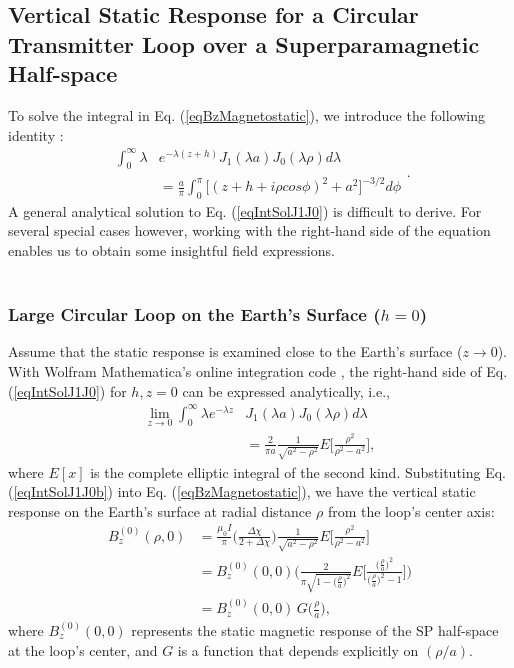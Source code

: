 \documentclass[onecolumn]{IEEEtran} %
\begin{document}
\subsection{Vertical Static Response for a Circular Transmitter Loop over a Superparamagnetic Half-space} \label{secVertical} To solve the integral in Eq. (\ref{eqBzMagnetostatic}), we introduce the following identity \citep{Erdelyi1954}:
\begin{equation}
\begin{split}
\int^{\infty}_0 \lambda &e^{-\lambda (z+h)} J_1(\lambda a) J_0 (\lambda \rho) d \lambda \\
&= \frac{a}{\pi} \int_0^\pi \big [ (z +h + i\rho cos\phi )^2 + a^2 \big ]^{-3/2} d\phi
\end{split}.
\label{eqIntSolJ1J0}
\end{equation}
A general analytical solution to Eq. (\ref{eqIntSolJ1J0}) is difficult to derive. For several special cases however, working with the right-hand side of the equation enables us to obtain some insightful field expressions.
\\\\
\subsubsection{Large Circular Loop on the Earth's Surface ($h=0$)}
Assume that the static response is examined close to the Earth's surface ($z \rightarrow 0$). With Wolfram Mathematica's online integration code \citep{Wolfram2016}, the right-hand side of Eq. (\ref{eqIntSolJ1J0}) for $h,z = 0$ can be expressed analytically, i.e.,
\begin{align}
\lim_{z \rightarrow 0} \int^{\infty}_0 \lambda e^{-\lambda z} &J_1(\lambda a) J_0 (\lambda \rho) d \lambda \nonumber \\
\label{eqIntSolJ1J0b} &= \frac{2 }{\pi a} \frac{1}{\sqrt{a^2-\rho^2}} E \Bigg [ \frac{\rho^2}{\rho^2 - a^2} \Bigg ],
\end{align}
where $E[x]$ is the complete elliptic integral of the second kind. Substituting Eq. (\ref{eqIntSolJ1J0b}) into Eq. (\ref{eqBzMagnetostatic}), we have the vertical static response on the Earth's surface at radial distance $\rho$ from the loop's center axis:
\begin{equation}
\begin{split}
B^{(0)}_z(\rho,0) &= \frac{\mu_0 I}{\pi} \Bigg ( \frac{\Delta \chi}{2+\Delta \chi} \Bigg ) \frac{1}{\sqrt{a^2 -\rho^2}} E \Bigg [ \frac{ \rho^2}{\rho^2 - a^2} \Bigg ] \\
&= B^{(0)}_z(0,0) \Bigg ( \frac{2 }{\pi \sqrt{1 -\big ( \frac{\rho}{a} \big )^2}} E \Bigg [ \frac{ \big (\frac{\rho}{a} \big )^2}{\big (\frac{\rho}{a} \big )^2 - 1} \Bigg ] \Bigg ) \\
&= B_z^{(0)}(0,0) \, G \Big (\frac{\rho}{a} \Big ),
\end{split}
\label{eqIntSolJ1J0a3}
\end{equation}
where $B^{(0)}_z (0, 0)$  represents the static magnetic response of the SP half-space at the loop's center, and $G$ is a function that depends explicitly on $(\rho /a)$.
\\
\end{document}
